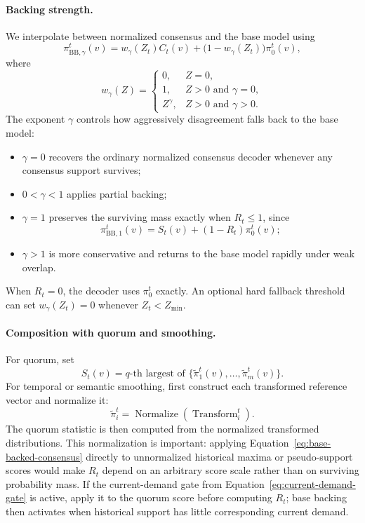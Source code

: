 \documentclass{article}
\begin{document}
\paragraph{Backing strength.}
We interpolate between normalized consensus and the base model using
\begin{equation}
\pi_{\mathrm{BB},\gamma}^t(v)
=
w_\gamma(Z_t)C_t(v)
+
\bigl(1-w_\gamma(Z_t)\bigr)\pi_0^t(v),
\label{eq:base-backed-consensus}
\end{equation}
where
\[
w_\gamma(Z)=
\begin{cases}
0, & Z=0,\\
1, & Z>0\text{ and }\gamma=0,\\
Z^\gamma, & Z>0\text{ and }\gamma>0.
\end{cases}
\]
The exponent $\gamma$ controls how aggressively disagreement falls back to
the base model:
\begin{itemize}
    \item $\gamma=0$ recovers the ordinary normalized consensus decoder
    whenever any consensus support survives;
    \item $0<\gamma<1$ applies partial backing;
    \item $\gamma=1$ preserves the surviving mass exactly when $R_t\leq1$,
    since
    \[
    \pi_{\mathrm{BB},1}^t(v)
    =
    S_t(v)+(1-R_t)\pi_0^t(v);
    \]
    \item $\gamma>1$ is more conservative and returns to the base model
    rapidly under weak overlap.
\end{itemize}
When $R_t=0$, the decoder uses $\pi_0^t$ exactly. An optional hard fallback
threshold can set $w_\gamma(Z_t)=0$ whenever $Z_t<Z_{\min}$.

\paragraph{Composition with quorum and smoothing.}
For quorum, set
\[
S_t(v)
=
q\text{-th largest of }
\{\widetilde{\pi}_1^t(v),\ldots,\widetilde{\pi}_m^t(v)\}.
\]
For temporal or semantic smoothing, first construct each transformed
reference vector and normalize it:
\[
\widetilde{\pi}_i^t
=
\operatorname{Normalize}\!\left(
\operatorname{Transform}_i^t
\right).
\]
The quorum statistic is then computed from the normalized transformed
distributions. This normalization is important: applying
Equation~\ref{eq:base-backed-consensus} directly to unnormalized historical
maxima or pseudo-support scores would make $R_t$ depend on an arbitrary score
scale rather than on surviving probability mass. If the current-demand gate
from Equation~\ref{eq:current-demand-gate} is active, apply it to the quorum
score before computing $R_t$; base backing then activates when historical
support has little corresponding current demand.
\end{document}
